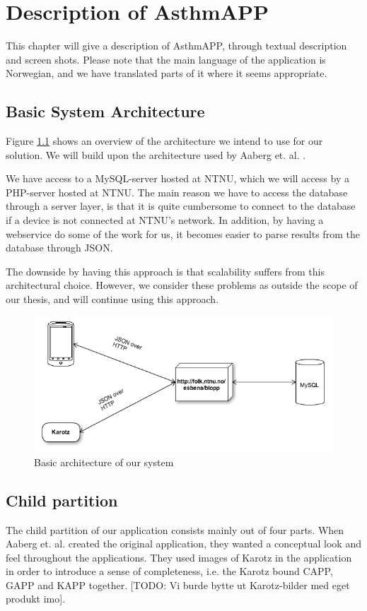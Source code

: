 \chapter{Description of AsthmAPP}
\label{chp:description}

This chapter will give a description of AsthmAPP, through textual description and screen shots. Please note that the main language of the application is Norwegian, and we have translated parts of it where it seems appropriate. 

\section{Basic System Architecture}
\label{sec:architecture}
Figure \ref{fig:basic-architecture} shows an overview of the architecture we intend to use for our solution. We will build upon the architecture used by Aaberg et. al. \cite{CustomerDriven}.

We have access to a MySQL-server hosted at NTNU, which we will access by a PHP-server hosted at NTNU. The main reason we have to access the database through a server layer, is that it is quite cumbersome to connect to the database if a device is not connected at NTNU's network. In addition, by having a webservice do some of the work for us, it becomes easier to parse results from the database through JSON.   


The downside by having this approach is that scalability suffers from this architectural choice. However, we consider these problems as outside the scope of our thesis, and will continue using this approach.

\begin{figure}
		\centering
			\includegraphics[width=0.50\paperwidth]{Pictures/basic-architecture.png}
		\caption{Basic architecture of our system}
		\label{fig:basic-architecture}
\end{figure}

\section{Child partition}
\label{sec:description-child-partition}
The child partition of our application consists mainly out of four parts. When Aaberg et. al. created the original application, they wanted a conceptual look and feel throughout the applications. They used images of Karotz in the application in order to introduce a sense of completeness, i.e. the Karotz bound CAPP, GAPP and KAPP together. [TODO: Vi burde bytte ut Karotz-bilder med eget produkt imo]. 

